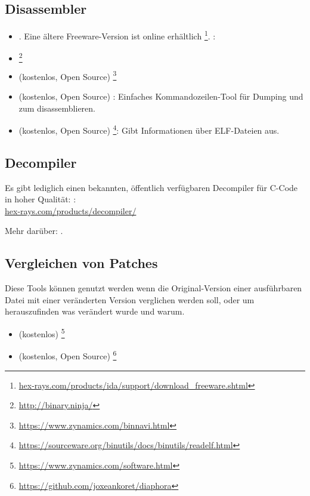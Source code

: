 \subsection{Disassembler}


\begin{itemize}
\item {}. Eine ältere Freeware-Version ist online erhältlich
\footnote{\href{http://go.yurichev.com/17031}{hex-rays.com/products/ida/support/download\_freeware.shtml}}.
\ShortHotKeyCheatsheet: 

\item {}\footnote{\url{http://binary.ninja/}}

\item (kostenlos, Open Source) \footnote{\url{https://www.zynamics.com/binnavi.html}}

\item (kostenlos, Open Source) : Einfaches Kommandozeilen-Tool für Dumping und zum disassemblieren.

\item (kostenlos, Open Source) \footnote{\url{https://sourceware.org/binutils/docs/binutils/readelf.html}}:
Gibt Informationen über ELF-Dateien aus.
\end{itemize}

\subsection{Decompiler}

Es gibt lediglich einen bekannten, öffentlich verfügbaren Decompiler für C-Code in
hoher Qualität: :\\
\href{http://go.yurichev.com/17033}{hex-rays.com/products/decompiler/}

Mehr darüber: .

\subsection{Vergleichen von Patches}

Diese Tools können genutzt werden wenn die Original-Version einer ausführbaren Datei
mit einer veränderten Version verglichen werden soll, oder um herauszufinden was
verändert wurde und warum.

\begin{itemize}
\item (kostenlos) \footnote{\url{https://www.zynamics.com/software.html}}

\item (kostenlos, Open Source) \footnote{\url{https://github.com/joxeankoret/diaphora}}
\end{itemize}

